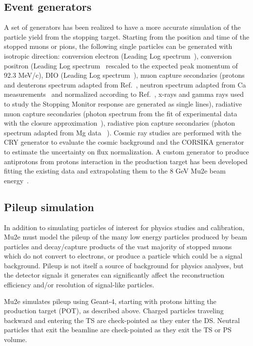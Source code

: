 \subsection{Event generators}
A set of generators has been realized to have a more accurate simulation of the particle yield from the stopping target. Starting from the position and time of the stopped muons or pions, the following single particles can be generated with isotropic direction: conversion electron (Leading Log spectrum~\cite{Czarnecki:2011mx, Szafron:2017guu}), conversion positron (Leading Log spectrum~\cite{Czarnecki:2011mx, Szafron:2017guu} rescaled to the expected peak momentum of 92.3 MeV/c), DIO (Leading Log spectrum~\cite{Szafron:2016}), muon capture secondaries (protons and deuterons spectrum adapted from Ref.~\cite{TWIST:2020, ALCAP:2022}, neutron spectrum adapted from Ca measurements~\cite{MCnspectrum:1978} and normalized according to Ref.~\cite{MCnnorm:1965}, x-rays and gamma rays used to study the Stopping Monitor response are generated as single lines), radiative muon capture secondaries (photon spectrum from the fit of experimental data~\cite{TRIUMF:1999} with the closure approximation~\cite{closureapprox}), radiative pion capture secondaries (photon spectrum adapted from Mg data ~\cite{Bistirlich:1972}). Cosmic ray studies are performed with the CRY generator to evaluate the cosmic background and the CORSIKA generator~\cite{CORSIKA:1998} to estimate the uncertainty on flux normalization. A custom generator to produce antiprotons from protons interaction in the production target has been developed fitting the existing data and extrapolating them to the 8 GeV Mu2e beam energy~\cite{Mu2e:2022ggl}.

\subsection{Pileup simulation}
In addition to simulating particles of interest for physics studies and calibration, Mu2e must model the pileup of the many low energy particles produced by beam particles and decay/capture products of the vast majority of stopped muons which do not convert to electrons, or produce a particle which could be a signal background. Pileup is not itself a source of background for physics analyses, but the detector signals it generates can significantly affect the reconstruction efficiency and/or resolution of signal-like particles.

Mu2e simulates pileup using Geant-4, starting with protons hitting the production target (POT), as described above. Charged particles traveling backward and entering the TS are check-pointed as they enter the DS. Neutral particles that exit the beamline are check-pointed as they exit the TS or PS volume.

